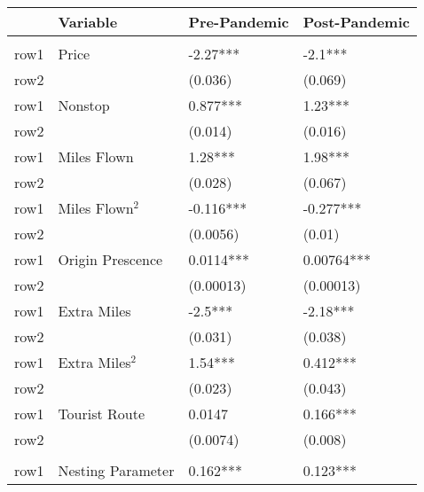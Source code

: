 
\begin{tabular}[t]{llll}
\toprule
  & Variable & Pre-Pandemic & Post-Pandemic\\
\midrule
\addlinespace[0.3em]
\multicolumn{4}{l}{\textbf{Linear Coefficients}}\\
\hspace{1em}row1 & Price & -2.27*** & -2.1***\\
\hspace{1em}row2 &  & (0.036) & (0.069)\\
\hspace{1em}row1 & Nonstop & 0.877*** & 1.23***\\
\hspace{1em}row2 &  & (0.014) & (0.016)\\
\hspace{1em}row1 & Miles Flown & 1.28*** & 1.98***\\
\hspace{1em}row2 &  & (0.028) & (0.067)\\
\hspace{1em}row1 & Miles Flown$^2$ & -0.116*** & -0.277***\\
\hspace{1em}row2 &  & (0.0056) & (0.01)\\
\hspace{1em}row1 & Origin Prescence & 0.0114*** & 0.00764***\\
\hspace{1em}row2 &  & (0.00013) & (0.00013)\\
\hspace{1em}row1 & Extra Miles & -2.5*** & -2.18***\\
\hspace{1em}row2 &  & (0.031) & (0.038)\\
\hspace{1em}row1 & Extra Miles$^2$ & 1.54*** & 0.412***\\
\hspace{1em}row2 &  & (0.023) & (0.043)\\
\hspace{1em}row1 & Tourist Route & 0.0147 & 0.166***\\
\hspace{1em}row2 &  & (0.0074) & (0.008)\\
\midrule
\addlinespace[0.3em]
\multicolumn{4}{l}{\textbf{Nesting Coefficient}}\\
\hspace{1em}row1 & Nesting Parameter & 0.162*** & 0.123***\\

\end{tabular}
